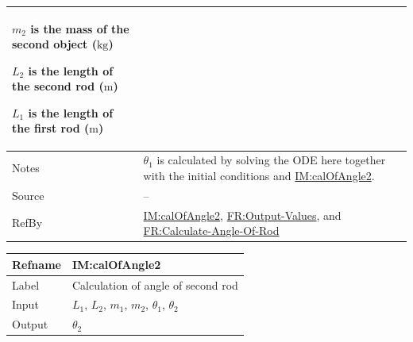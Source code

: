 \documentclass[12pt]{article}
\begin{document}
{\begin{minipage}{\textwidth}
\begin{tabular}{>{\raggedright}p{}>{\raggedright\arraybackslash}p{}}
\begin{symbDescription}
              \item{${m_{2}}$ is the mass of the second object (${\text{kg}}$)}
              \item{${L_{2}}$ is the length of the second rod (${\text{m}}$)}
              \item{${L_{1}}$ is the length of the first rod (${\text{m}}$)}
              \end{symbDescription}
\\ \midrule
Notes & ${θ_{1}}$ is calculated by solving the ODE here together with the initial conditions and \hyperref[IM:calOfAngle2]{IM:calOfAngle2}.
        
\\ \midrule
Source & --
         
\\ \midrule
RefBy & \hyperref[IM:calOfAngle2]{IM:calOfAngle2}, \hyperref[outputValues]{FR:Output-Values}, and \hyperref[calcAng]{FR:Calculate-Angle-Of-Rod}
        
\\ \bottomrule
\end{tabular}
\end{minipage}

\medskip
\noindent
\begin{minipage}{\textwidth}
\begin{tabular}{>{\raggedright}p{}>{\raggedright\arraybackslash}p{}}
\toprule \textbf{Refname} & \textbf{IM:calOfAngle2}
\label{IM:calOfAngle2}
\\ \midrule
Label & Calculation of angle of second rod
        
\\ \midrule
Input & ${L_{1}}$, ${L_{2}}$, ${m_{1}}$, ${m_{2}}$, ${θ_{1}}$, ${θ_{2}}$
        
\\ \midrule
Output & ${θ_{2}}$
         

\end{tabular}
\end{minipage}}
\end{document}
